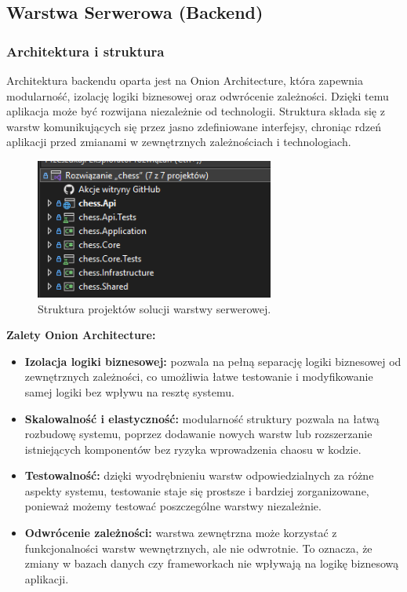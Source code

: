 \documentclass[twoside]{projektInzynierskiMS1}
\begin{document}
\newpage

\subsection{Warstwa Serwerowa (Backend)} 

\subsubsection{Architektura i struktura} 

\noindent
Architektura backendu oparta jest na Onion Architecture, która zapewnia modularność, izolację logiki biznesowej oraz odwrócenie zależności. Dzięki temu aplikacja może być rozwijana niezależnie od technologii. Struktura składa się z warstw komunikujących się przez jasno zdefiniowane interfejsy, chroniąc rdzeń aplikacji przed zmianami w zewnętrznych zależnościach i technologiach.

\vspace{0.5cm}
\begin{figure}[h!] 
    \centering 
    \includegraphics[width=0.7\textwidth]{images/struktura_back.png} 
    \caption{Struktura projektów solucji warstwy serwerowej.} 
\end{figure}
\vspace{0.5cm}

\noindent \textbf{Zalety Onion Architecture:}
\begin{itemize}
    \item \textbf{Izolacja logiki biznesowej:} pozwala na pełną separację logiki biznesowej od zewnętrznych zależności, co umożliwia łatwe testowanie i modyfikowanie samej logiki bez wpływu na resztę systemu.
    \item \textbf{Skalowalność i elastyczność:} modularność struktury pozwala na łatwą rozbudowę systemu, poprzez dodawanie nowych warstw lub rozszerzanie istniejących komponentów bez ryzyka wprowadzenia chaosu w kodzie.
    \item \textbf{Testowalność:} dzięki wyodrębnieniu warstw odpowiedzialnych za różne aspekty systemu, testowanie staje się prostsze i bardziej zorganizowane, ponieważ możemy testować poszczególne warstwy niezależnie.
    \item \textbf{Odwrócenie zależności:} warstwa zewnętrzna może korzystać z funkcjonalności warstw wewnętrznych, ale nie odwrotnie. To oznacza, że zmiany w bazach danych czy frameworkach nie wpływają na logikę biznesową aplikacji.
\end{itemize}
\end{document}
